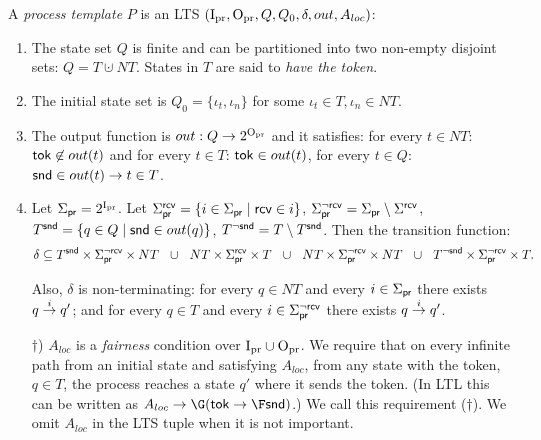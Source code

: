  \label{page:tok_rings:defs:process_template}
A {\em process template} $P$ is an LTS
$(\Ipr, \Opr, Q, Q_0, \delta, out, A_{loc})$:
\begin{enumerate}[label*=\roman*)]
\item 
The state set $Q$ is finite and can be partitioned into two non-empty disjoint sets: $Q = T \cupdot NT$. 
    States in $T$ are said to {\em have the token}.

\item
The initial state set is $Q_0  = \{\iota_t, \iota_n\}$ for some $\iota_t \in T, \iota_n \in NT$.

\item
The output function is $out: Q \rightarrow 2^{\Opr}$ and it satisfies:
\li
\- for every $t \in NT$: $\token \not\in out(t)$ and for every $t \in T$: $\token \in out(t)$,
\- for every $t \in Q$: $\tsnd \in out(t) \impl t \in T$.
\il

\item
Let $\ActionsProc = 2^\Ipr$.
Let $\ActionsProc^\trcv = \{ i \in \ActionsProc \| \trcv \in i \}$, 
$\ActionsProc^{\neg \trcv} = \ActionsProc \setminus \Sigma^\trcv$,
$T^\tsnd = \{ q \in \Locals \| \tsnd \in out(q) \}$,
$T^{\neg \tsnd} = T \setminus T^\tsnd$.
Then the transition function: 
\begin{equation}\label{tok_rings:eq:process-trans}
\delta \subseteq 
T^\tsnd \times \ActionsProc^{\neg \trcv}\times NT  ~~\cup~~
NT\times\ActionsProc^\trcv\times T   ~~\cup~~
NT\times\ActionsProc^{\neg \trcv}\times NT   ~~\cup~~
T^{\neg \tsnd}\times\ActionsProc^{\neg \trcv}\times T.
\end{equation}

Also, $\delta$ is non-terminating: 
for every $q \in NT$ and every $i \in \ActionsProc$
  there exists $\trans{q}{q'}{i}$; 
and for every $q \in T$ and every $i \in \ActionsProc^{\neg \trcv}$
  there exists $\trans{q}{q'}{i}$.

\item [$\dagger$)]
$A_{loc}$ is a \emph{fairness} condition over $\Ipr \cup \Opr$.
We require that on every infinite path from an initial state and satisfying $A_{loc}$,
from any state with the token, $q \in T$, the process reaches a state $q'$ where it sends the token.
(In LTL this can be written as $A_{loc} \impl \G(\token \impl \F \tsnd)$.)
We call this requirement ($\dagger$).
We omit $A_{loc}$ in the LTS tuple when it is not important.
\end{enumerate}



